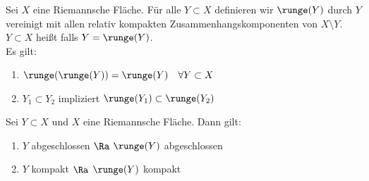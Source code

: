 \begin{defin}
  Sei $X$ eine Riemannsche Fläche. Für alle $Y \subset X$ definieren
  wir $\runge(Y)$ durch $Y$ vereinigt mit allen relativ kompakten
  Zusammenhangskomponenten von $X \setminus Y$. \\
  $Y \subset X$ heißt  falls $Y = \runge(Y)$. \\
  Es gilt:
  \begin{enumerate}
  \item $\runge(\runge(Y)) = \runge(Y) \quad \forall Y \subset X$
  \item $Y_1 \subset Y_2$ impliziert $\runge(Y_1) \subset \runge(Y_2)$
  \end{enumerate}
\end{defin}

\begin{thm}
  Sei $Y \subset X$ und $X$ eine Riemannsche Fläche. Dann gilt:
  \begin{enumerate}
  \item $Y$ abgeschlossen $\Ra$ $\runge(Y)$ abgeschlossen
  \item $Y$ kompakt $\Ra$ $\runge(Y)$ kompakt
  \end{enumerate}
\end{thm}

